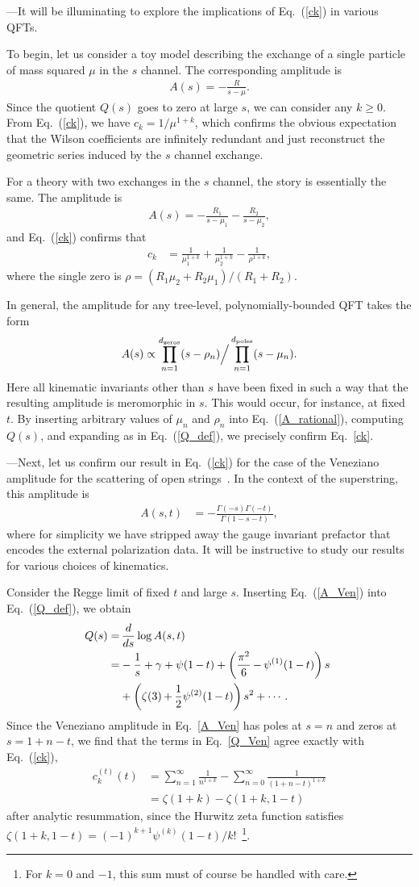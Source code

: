 \documentclass[twocolumn,english,aps,prd,reprint,floatfix,notitlepage,footinbib,preprintnumbers,superscriptaddress,longbibliography]{revtex4-1}
\newcommand{\be}{\begin{equation}}
\newcommand{\ee}{\end{equation}}
\newcommand{\Eq}[1]{Eq.~(\ref{#1})}
\newcommand{\eq}[2]{\be\begin{aligned}#1 \label{#2}\end{aligned}\ee}
\newcommand{\mysec}[1]{\noindent {\bf #1.}---}
\begin{document}
\medskip
\mysec{Field Theory Examples}It will be illuminating to explore the implications of \Eq{ck} in various QFTs.

To begin, let us consider a toy model describing the exchange of a single particle of mass squared $\mu$ in the $s$ channel.  The corresponding amplitude is
\eq{
A(s) = -\frac{R}{s-\mu}.
}{}
Since the quotient $Q(s)$ goes to zero at large $s$, we can consider any $k\geq 0$.  From \Eq{ck}, we have
$c_k =1/\mu^{1+k}$,
which confirms the obvious expectation that the Wilson coefficients are infinitely redundant and just reconstruct the geometric series induced by the $s$ channel exchange.

For a theory with two exchanges in the $s$ channel, the story is essentially the same.  The amplitude is
\eq{
A(s) = -\frac{R_1}{s-\mu_1}-\frac{R_2}{s-\mu_2},
}{}
and \Eq{ck}  confirms that
\eq{
c_k &= \frac{1}{\mu_1^{1+k}} + \frac{1}{\mu_2^{1+k}} - \frac{1}{\rho^{1+k}} ,
}{}
where the single zero is $\rho =  (R_1 \mu_2 + R_2 \mu_1)/(R_1+R_2)$.

In general, the amplitude for any tree-level, polynomially-bounded QFT takes the form
\eq{
A(s) \propto \prod\limits_{n=1}^{d_{\rm zeros}} (s-\rho_n) \Big/ \prod\limits_{n=1}^{d_{\rm poles}}(s-\mu_n).
}{A_rational}
Here all kinematic invariants other than $s$ have been fixed in such a way that the resulting amplitude is meromorphic in $s$.  This would occur, for instance, at fixed $t$.
By inserting arbitrary values of $\mu_n$ and $\rho_n$ into  \Eq{A_rational}, computing $Q(s)$, and expanding as in \Eq{Q_def}, we precisely confirm Eq.~\eqref{ck}.


\medskip
\mysec{String Theory Examples}Next, let us confirm our result in \Eq{ck} for the case of the Veneziano amplitude for the scattering of open strings~\cite{Veneziano}.  In the context of the superstring, this amplitude is
\eq{
A(s,t) &= -\frac{\Gamma(-s)\Gamma(-t)}{\Gamma(1-s-t)} ,
}{A_Ven}
where for simplicity we have stripped away the gauge invariant prefactor that encodes the external polarization data. It will be instructive to study our results for various choices of kinematics.

\smallskip
{} Consider the Regge limit of fixed $t$ and large $s$.  Inserting \Eq{A_Ven} into \Eq{Q_def}, we obtain
\eq{\hspace{-1mm}
Q(s) =&\, \frac{d}{ds} \log A(s,t) \\
=& -\frac{1}{s} + \gamma +\psi(1\,{-}\,t) + \left(\frac{\pi^2}{6} \,{-}\, \psi^{(1)}(1\,{-}\,t) \right)s\\
&+ \left(\zeta(3) \,{+}\, \frac12  \psi^{(2)}(1\,{-}\,t) \right)s^2 +\cdots.
}{Q_Ven}
Since the Veneziano amplitude in Eq.~\eqref{A_Ven} has poles at $s=n$ and zeros at $s=1+n-t$, we find that the terms in Eq.~\eqref{Q_Ven} agree exactly with \Eq{ck},
\eq{
c_k^{(t)}(t) &= \sum_{n=1}^\infty \frac{1}{n^{1+k}} -\sum_{n=0}^\infty \frac{1}{(1+n-t)^{1+k}} \\
&= \zeta(1+k) - \zeta(1+k,1-t)
}{eq:ckstring}
after analytic resummation, since the Hurwitz zeta function satisfies $\zeta(1+k,1-t) = (-1)^{k+1} \psi^{(k)}(1-t)/k!$~\footnote{For $k=0$ and $-1$, this sum must of course be handled with care. }.
\end{document}
